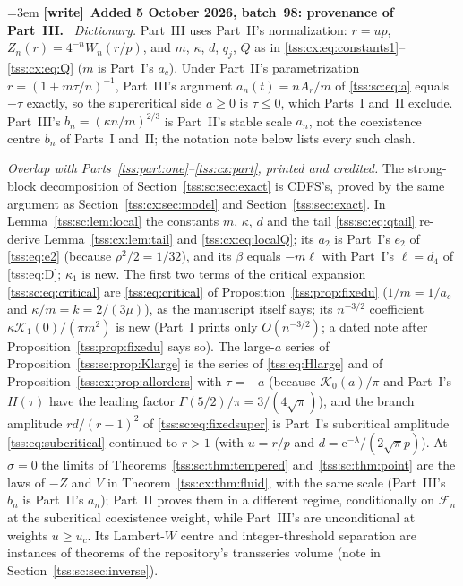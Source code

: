 \documentclass[11pt]{article}
\theoremstyle{remark}\newtheorem{remark}[theorem]{Remark}
\theoremstyle{definition}\newtheorem{definition}[theorem]{Definition}
\newcommand{\e}{\mathrm e}
\newcommand{\Fev}{\mathcal F_n}
\newenvironment{writenote}[1][]{\par\smallskip\begingroup\small\emergencystretch=3em
 \noindent\textbf{[write]}\if\relax\detokenize{#1}\relax\else~\textbf{#1.}\fi\ }%
 {\par\endgroup\smallskip}
\begin{document}
\begin{writenote}[Added 5 October 2026, batch~98: provenance of Part~III]
\emph{Dictionary.} Part~III uses Part~II's normalization: $r=up$,
$Z_n(r)=4^{-n}W_n(r/p)$, and $m$, $\kappa$, $d$, $q_j$, $Q$ as in
\eqref{tss:cx:eq:constants1}--\eqref{tss:cx:eq:Q} ($m$ is Part~I's $a_c$).
Under Part~II's parametrization $r=(1+m\tau/n)^{-1}$, Part~III's argument
$a_n(t)=nA_r/m$ of \eqref{tss:sc:eq:a} equals $-\tau$ exactly, so the
supercritical side $a\ge0$ is $\tau\le0$, which Parts~I and~II exclude.
Part~III's $b_n=(\kappa n/m)^{2/3}$ is Part~II's stable scale $a_n$, not the
coexistence centre $b_n$ of Parts~I and~II; the notation note below lists
every such clash.

\emph{Overlap with Parts~\ref{tss:part:one}--\ref{tss:cx:part}, printed and
credited.} The strong-block decomposition of
Section~\ref{tss:sc:sec:exact} is CDFS's, proved by the same argument as
Section~\ref{tss:cx:sec:model} and Section~\ref{tss:sec:exact}. In
Lemma~\ref{tss:sc:lem:local} the constants $m$, $\kappa$, $d$ and the tail
\eqref{tss:sc:eq:qtail} re-derive Lemma~\ref{tss:cx:lem:tail} and
\eqref{tss:cx:eq:localQ}; its $a_2$ is Part~I's $e_2$ of \eqref{tss:eq:e2}
(because $\rho^2/2=1/32$), and its $\beta$ equals $-m\ell$ with Part~I's
$\ell=d_4$ of \eqref{tss:eq:D}; $\kappa_1$ is new. The first two terms of
the critical expansion \eqref{tss:sc:eq:critical} are
\eqref{tss:eq:critical} of Proposition~\ref{tss:prop:fixedu} ($1/m=1/a_c$
and $\kappa/m=k=2/(3\mu)$), as the manuscript itself says; its $n^{-3/2}$
coefficient $\kappa\mathcal K_1(0)/(\pi m^2)$ is new (Part~I prints only
$O(n^{-3/2})$; a dated note after Proposition~\ref{tss:prop:fixedu} says
so). The large-$a$ series of Proposition~\ref{tss:sc:prop:Klarge} is the
series of \eqref{tss:eq:Hlarge} and of
Proposition~\ref{tss:cx:prop:allorders} with $\tau=-a$ (because
$\mathcal K_0(a)/\pi$ and Part~I's $H(\tau)$ have the leading factor
$\Gamma(5/2)/\pi=3/(4\sqrt\pi)$), and the branch amplitude
$rd/(r-1)^2$ of \eqref{tss:sc:eq:fixedsuper} is Part~I's subcritical
amplitude \eqref{tss:eq:subcritical} continued to $r>1$ (with $u=r/p$ and
$d=\e^{-\lambda}/(2\sqrt\pi p)$). At $\sigma=0$ the limits of
Theorems~\ref{tss:sc:thm:tempered} and~\ref{tss:sc:thm:point} are the laws
of $-Z$ and $V$ in Theorem~\ref{tss:cx:thm:fluid}, with the same scale
(Part~III's $b_n$ is Part~II's $a_n$); Part~II proves them in a different
regime, conditionally on $\Fev$ at the subcritical coexistence weight,
while Part~III's are unconditional at weights $u\ge u_c$. Its Lambert-$W$
centre and integer-threshold separation are instances of theorems of the
repository's transseries volume (note in Section~\ref{tss:sc:sec:inverse}).

\end{writenote}
\end{document}
